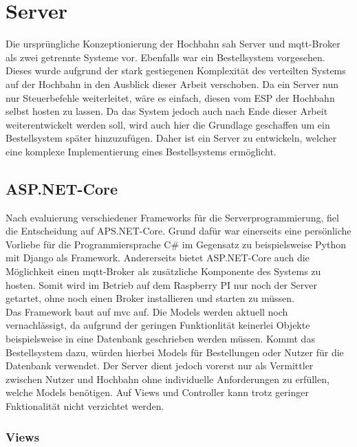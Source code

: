 \chapter{Server}
Die ursprüngliche Konzeptionierung der Hochbahn sah Server und \acrshort{mqtt}-Broker als zwei getrennte Systeme vor. Ebenfalls war ein Bestellsystem vorgesehen. Dieses wurde aufgrund der stark gestiegenen Komplexität des verteilten Systems auf der Hochbahn in den Ausblick dieser Arbeit verschoben. Da ein Server nun nur Steuerbefehle weiterleitet, wäre es einfach, diesen vom ESP der Hochbahn selbst hosten zu lassen. Da das System jedoch auch nach Ende dieser Arbeit weiterentwickelt werden soll, wird auch hier die Grundlage geschaffen um ein Bestellsystem später hinzuzufügen. Daher ist ein Server zu entwickeln, welcher eine komplexe Implementierung eines Bestellsystems ermöglicht. 
\section{ASP.NET-Core}
Nach evaluierung verschiedener Frameworks für die Serverprogrammierung, fiel die Entscheidung auf APS.NET-Core. Grund dafür war einerseits eine persönliche Vorliebe für die Programmiersprache C\# im Gegensatz zu beispielsweise Python mit Django als Framework. Andererseits bietet ASP.NET-Core auch die Möglichkeit einen \acrshort{mqtt}-Broker als zusätzliche Komponente des Systems zu hosten. Somit wird im Betrieb auf dem Raspberry PI nur noch der Server getartet, ohne noch einen Broker installieren und starten zu müssen. \\
Das Framework baut auf \acrfull{mvc} auf. Die Models werden aktuell noch vernachlässigt, da aufgrund der geringen Funktionlität keinerlei Objekte beispielsweise in eine Datenbank geschrieben werden müssen. Kommt das Bestellsystem dazu, würden hierbei Models für Bestellungen oder Nutzer für die Datenbank verwendet. Der Server dient jedoch vorerst nur als Vermittler zwischen Nutzer und Hochbahn ohne individuelle Anforderungen zu erfüllen, welche Models benötigen. Auf Views und Controller kann trotz geringer Fnktionalität nicht verzichtet werden. 

\subsection{Views}
